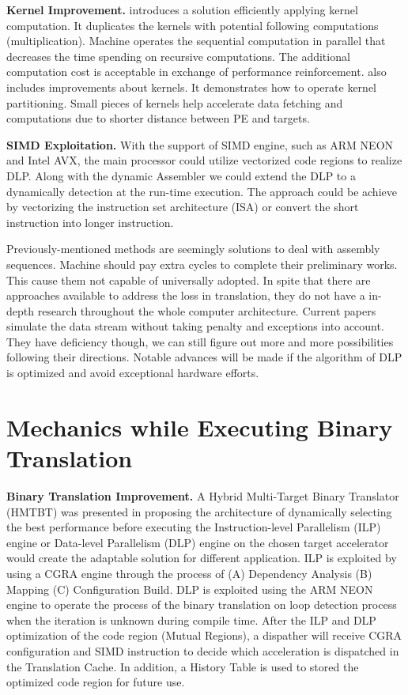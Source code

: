 \documentclass[sigconf, nonacm, natbib=false]{acmart}
\begin{document}
{\bf Kernel Improvement.} \parencite{dlp_in_streaming} introduces a solution efficiently applying kernel computation. It duplicates the kernels with potential following computations (multiplication). Machine operates the sequential computation in parallel that decreases the time spending on recursive computations. The additional computation cost is acceptable in exchange of performance reinforcement. \parencite{adaptive_dlp} also includes improvements about kernels. It demonstrates how to operate kernel partitioning. Small pieces of kernels help accelerate data fetching and computations due to shorter distance between PE and targets. 

{\bf SIMD Exploitation.} 
With the support of SIMD engine, such as ARM NEON and Intel AVX, the main processor could utilize vectorized code regions to realize DLP. Along with the dynamic Assembler we could extend the DLP to a dynamically detection at the run-time execution. The approach could be achieve by vectorizing the instruction set architecture (ISA) or convert the short instruction into longer instruction. 

Previously-mentioned methods are seemingly solutions to deal with assembly sequences. Machine should pay extra cycles to complete their preliminary works. This cause them not capable of universally adopted. In spite that there are approaches available to address the loss in translation, they do not have a in-depth research throughout the whole computer architecture. Current papers simulate the data stream without taking penalty and exceptions into account. They have deficiency though, we can still figure out more and more possibilities following their directions. Notable advances will be made if the algorithm of DLP is optimized and avoid exceptional hardware efforts.

\section{Mechanics while Executing Binary Translation}
{\bf Binary Translation Improvement.} A Hybrid Multi-Target Binary Translator (HMTBT) was presented in \parencite{an_energy_efficient_multitarget} proposing the architecture of dynamically selecting the best performance before executing the Instruction-level Parallelism (ILP) engine or Data-level Parallelism (DLP) engine on the chosen target accelerator would create the adaptable solution for different application. ILP is exploited by using a CGRA engine through the process of (A) Dependency Analysis (B) Mapping (C) Configuration Build. DLP is exploited using the ARM NEON engine to operate the process of the binary translation on loop detection process when the iteration is unknown during compile time. After the ILP and DLP optimization of the code region (Mutual Regions), a dispather will receive CGRA configuration and SIMD instruction to decide which acceleration is dispatched in the Translation Cache. In addition, a History Table is used to stored the optimized code region for future use. 
\end{document}
